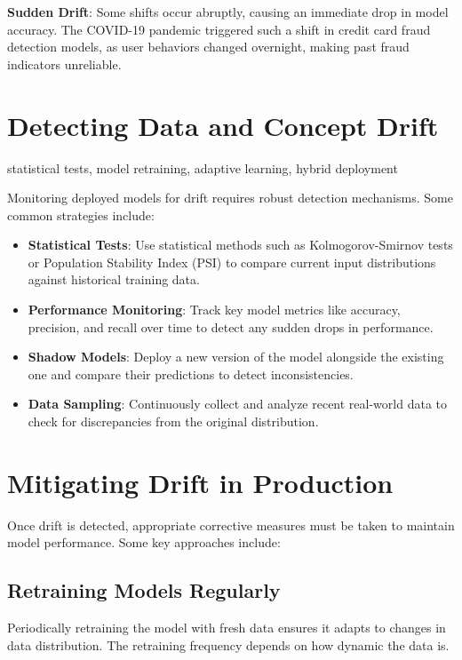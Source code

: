 \documentclass[12pt,openany, draft]{book}
\begin{document}
\textbf{Sudden Drift}: Some shifts occur abruptly, causing an immediate drop in model accuracy. The COVID-19 pandemic triggered such a shift in credit card fraud detection models, as user behaviors changed overnight, making past fraud indicators unreliable.



\section{Detecting Data and Concept Drift}

\begin{keywordsbox}
statistical tests, model retraining, adaptive learning, hybrid deployment
\end{keywordsbox}

Monitoring deployed models for drift requires robust detection mechanisms. Some common strategies include:

\begin{itemize}
    \item \textbf{Statistical Tests}: Use statistical methods such as Kolmogorov-Smirnov tests or Population Stability Index (PSI) to compare current input distributions against historical training data.
    \item \textbf{Performance Monitoring}: Track key model metrics like accuracy, precision, and recall over time to detect any sudden drops in performance.
    \item \textbf{Shadow Models}: Deploy a new version of the model alongside the existing one and compare their predictions to detect inconsistencies.
    \item \textbf{Data Sampling}: Continuously collect and analyze recent real-world data to check for discrepancies from the original distribution.
\end{itemize}



\section{Mitigating Drift in Production}

Once drift is detected, appropriate corrective measures must be taken to maintain model performance. Some key approaches include:


\subsection{Retraining Models Regularly}
Periodically retraining the model with fresh data ensures it adapts to changes in data distribution. The retraining frequency depends on how dynamic the data is.
\end{document}
